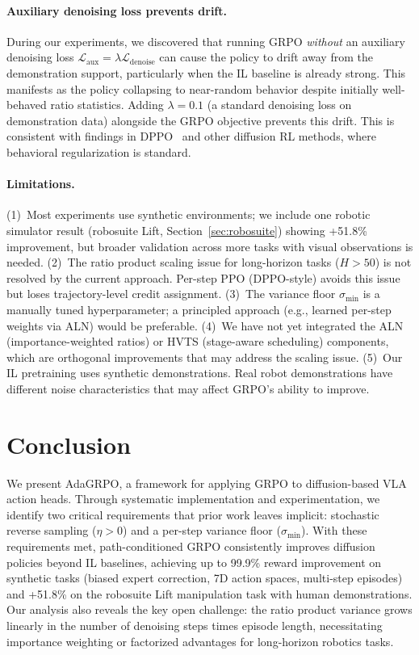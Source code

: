 \documentclass{article}
\begin{document}
\paragraph{Auxiliary denoising loss prevents drift.}
During our experiments, we discovered that running GRPO \emph{without} an auxiliary denoising loss $\mathcal{L}_\text{aux} = \lambda \mathcal{L}_\text{denoise}$ can cause the policy to drift away from the demonstration support, particularly when the IL baseline is already strong.
This manifests as the policy collapsing to near-random behavior despite initially well-behaved ratio statistics.
Adding $\lambda = 0.1$ (a standard denoising loss on demonstration data) alongside the GRPO objective prevents this drift.
This is consistent with findings in DPPO~\cite{ren2024dppo} and other diffusion RL methods, where behavioral regularization is standard.

\paragraph{Limitations.}
(1)~Most experiments use synthetic environments; we include one robotic simulator result (robosuite Lift, Section~\ref{sec:robosuite}) showing +51.8\% improvement, but broader validation across more tasks with visual observations is needed.
(2)~The ratio product scaling issue for long-horizon tasks ($H > 50$) is not resolved by the current approach. Per-step PPO (DPPO-style) avoids this issue but loses trajectory-level credit assignment.
(3)~The variance floor $\sigma_{\min}$ is a manually tuned hyperparameter; a principled approach (e.g., learned per-step weights via ALN) would be preferable.
(4)~We have not yet integrated the ALN (importance-weighted ratios) or HVTS (stage-aware scheduling) components, which are orthogonal improvements that may address the scaling issue.
(5)~Our IL pretraining uses synthetic demonstrations. Real robot demonstrations have different noise characteristics that may affect GRPO's ability to improve.


\section{Conclusion}
\label{sec:conclusion}

We present AdaGRPO, a framework for applying GRPO to diffusion-based VLA action heads.
Through systematic implementation and experimentation, we identify two critical requirements that prior work leaves implicit: stochastic reverse sampling ($\eta > 0$) and a per-step variance floor ($\sigma_{\min}$).
With these requirements met, path-conditioned GRPO consistently improves diffusion policies beyond IL baselines, achieving up to 99.9\% reward improvement on synthetic tasks (biased expert correction, 7D action spaces, multi-step episodes) and +51.8\% on the robosuite Lift manipulation task with human demonstrations.
Our analysis also reveals the key open challenge: the ratio product variance grows linearly in the number of denoising steps times episode length, necessitating importance weighting or factorized advantages for long-horizon robotics tasks.
\end{document}
